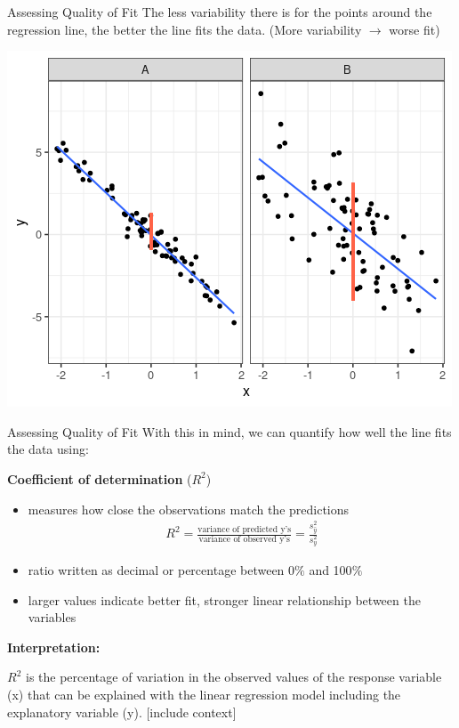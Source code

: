 \documentclass{beamer}
\begin{document}
\begin{frame}{Assessing Quality of Fit}
\small
The less variability there is for the points around the regression line, the better the line fits the data. (More variability $\rightarrow$ worse fit)

\begin{center}
\includegraphics[scale=0.5]{qof2.png}
\end{center}
\end{frame}

\begin{frame}{Assessing Quality of Fit}
    With this in mind, we can quantify how well the line fits the data using: \vspace{3mm}

\textbf{Coefficient of determination} ($R^2$)
\begin{itemize}
    \item measures how close the observations match the predictions
\begin{align*}
    R^2 = \frac{\text{variance of predicted y's}}{\text{variance of observed y's}} = \frac{s_{\hat{y}}^2}{s_y^2}
\end{align*}

\item ratio written as decimal or percentage between 0$\%$ and 100$\%$
\item larger values indicate better fit, stronger linear relationship between the variables
\end{itemize} \vspace{3mm}

\textbf{Interpretation:} 

$R^2$ is the percentage of variation in the observed values of the response variable (x) that can be explained with the linear regression model including the explanatory variable (y). [include context]

\end{frame}
\end{document}

